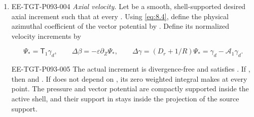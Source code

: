 \begin{proposition}
\begin{enumerate}[label=(\roman*)]
\item
\begin{EESegment}{EE-TGT-P093-004}
\emph{Axial velocity.} Let  be a smooth, shell-supported desired axial increment
such that  at every
. Using \eqref{eq:8.4}, define the physical azimuthal coefficient of the
vector potential by
. Define its normalized
velocity increments by
\end{EESegment}
\begin{equation}
\Psi_*=\mathsf T_1\gamma_d,
\qquad \Delta\beta=-\varepsilon\partial_Z\Psi_*,
\qquad \Delta\gamma=(D_r+1/R)\Psi_*=\gamma_d-\mathcal A_1\gamma_d.
\tag{8.14}\label{eq:8.14}
\end{equation}
\begin{EESegment}{EE-TGT-P093-005}
The actual increment  is divergence-free and
satisfies . If
, then
 and
. If
 does not depend on , its zero weighted
integral makes  at every point. The pressure and vector
potential are compactly supported inside the active shell, and their support in
 stays inside the projection of the source support.
\end{EESegment}
\end{enumerate}
\end{proposition}


